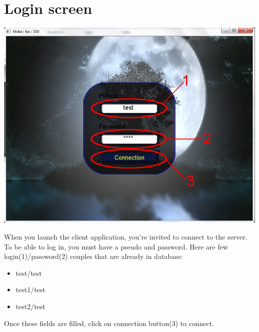 \documentclass{scrreprt}
\begin{document}
		  \section{Login screen}
		  \begin{center}
		  \includegraphics[scale=0.4]{connection_screen.png}
		  \end{center}
		  When you launch the client application, you're invited to connect to the server. To be able to log in, you must have a pseudo and password. Here are few login(1)/password(2) couples that are already in database:
		  \begin{itemize}
		  \item{test/test}
		  \item{test1/test}
		  \item{test2/test}
		  \end{itemize}

		  Once these fields are filled, click on connection button(3) to connect.
		  
\end{document}
